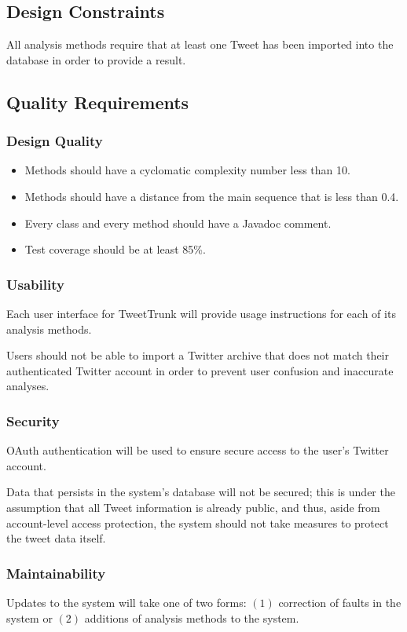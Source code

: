 \documentclass[a4paper, 12pt]{article}
\begin{document}
\subsection{Design Constraints}
All analysis methods require that at least one Tweet has been imported into the database in order to provide a result.

\subsection{Quality Requirements}
\subsubsection{Design Quality}
\begin{itemize}
\item Methods should have a cyclomatic complexity number less than 10.
\item Methods should have a distance from the main sequence that is less than 0.4.
\item Every class and every method should have a Javadoc comment.
\item Test coverage should be at least 85\%.
\end{itemize}

\subsubsection{Usability}
Each user interface for TweetTrunk will provide usage instructions for each of its analysis methods.

Users should not be able to import a Twitter archive that does not match their authenticated Twitter account in order to prevent user confusion and inaccurate analyses.

\subsubsection{Security}
OAuth authentication will be used to ensure secure access to the user's Twitter account.

Data that persists in the system's database will not be secured; this is under the assumption that all Tweet information is already public, and thus, aside from account-level access protection, the system should not take measures to protect the tweet data itself.

\subsubsection{Maintainability}
Updates to the system will take one of two forms: $(1)$ correction of faults in the system or $(2)$ additions of analysis methods to the system.
\end{document}
